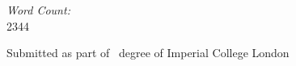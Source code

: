 \begin{titlepage}
\vspace*{2em}
\begin{center}
	\emph{Word Count:}\\
	2344
\end{center}

\vfill %
Submitted as part of 
\degreetype~degree of Imperial College London\\[0.5cm]

\makeatletter
\@date 
\makeatother


\end{titlepage}
